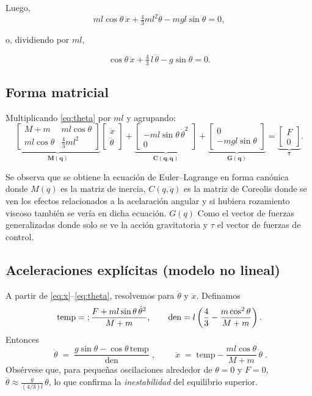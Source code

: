 \documentclass[a4paper,openright,9pt]{report}
\begin{document}
Luego,
\begin{equation}
m l \cos\theta\,\ddot x + \tfrac{4}{3} m l^2 \ddot\theta - m g l \sin\theta = 0,
\end{equation}

o, dividiendo por $m l$,

\begin{equation}
\boxed{\cos\theta\,\ddot x + \tfrac{4}{3}\,l\,\ddot\theta - g \sin\theta = 0.}
\label{eq:theta}
\end{equation}


\subsection{Forma matricial}
Multiplicando \eqref{eq:theta} por $m l$ y agrupando:
\[
\underbrace{\begin{bmatrix}
M+m & m l \cos\theta \\
m l \cos\theta & \tfrac{4}{3} m l^2
\end{bmatrix}}_{\displaystyle \bm M(\bm q)}
\begin{bmatrix}\ddot x\\ \ddot\theta\end{bmatrix}
+
\underbrace{\begin{bmatrix}
- m l \sin\theta\,\dot\theta^2\\[2pt] 0
\end{bmatrix}}_{\displaystyle \bm C(\bm q,\dot{\bm q})}
+
\underbrace{\begin{bmatrix}
0\\[2pt] - m g l \sin\theta
\end{bmatrix}}_{\displaystyle \bm G(\bm q)}
=
\underbrace{\begin{bmatrix}
F\\ 0
\end{bmatrix}}_{\displaystyle \bm \tau}.
\]

Se observa que se obtiene la ecuación de Euler–Lagrange en forma canónica donde $M(q)$ es la matriz de inercia,   $C( q,\dot{ q})$ es la matriz de Coreolis donde se ven los efectos relacionados a la acelaración angular y si hubiera rozamiento viscoso también se vería en dicha ecuación. $G(q)$ Como el vector de fuerzas generalizadas  donde solo se ve la acción gravitatoria y $\tau$ el vector de fuerzas de control. 


\subsection{Aceleraciones explícitas (modelo no lineal)}
A partir de \eqref{eq:x}--\eqref{eq:theta}, resolvemos para $\ddot \theta$ y $\ddot x$.
Definamos
\[
\text{temp} = \\; \frac{F + m l \sin\theta\,\dot\theta^{2}}{M+m},
\qquad
\text{den} = l\left(\frac{4}{3} - \frac{m\cos^{2}\theta}{M+m}\right).
\]
Entonces
\[
\boxed{\;\ddot\theta \;=\; \frac{g\sin\theta - \cos\theta\,\text{temp}}{\text{den}}\;},
\qquad
\boxed{\;\ddot x \;=\; \text{temp} - \frac{m l \cos\theta}{M+m}\,\ddot\theta\;}.
\]
Obsérvese que, para pequeñas oscilaciones alrededor de $\theta=0$ y $F=0$, 
\(
\ddot\theta \approx \frac{g}{(4/3)l}\,\theta
\),
lo que confirma la \emph{inestabilidad} del equilibrio superior.
\end{document}
